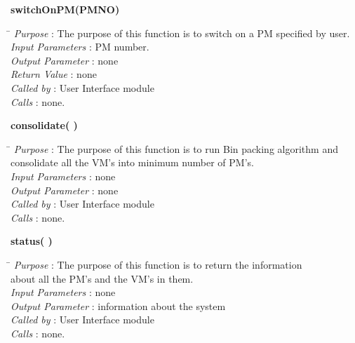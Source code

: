 \documentclass[a4paper,11pt]{article}
\begin{document}
\begin{itemize}
\textbf{switchOnPM(PM\textunderscore NO)}
  
\begin{tabbing}
\hspace*{4cm}\=  \kill
 \textit{Purpose} \> : The purpose of this function is to switch on a PM specified by user.\\
  \textit{Input Parameters} \> : PM number. \\
  \textit{Output Parameter} \> : none \\
  \textit{Return Value} \> : none \\
  \textit{Called by} \> : User Interface module \\
  \textit{Calls} \> : none.
\end{tabbing}

\textbf{consolidate( )}
  
\begin{tabbing}
\hspace*{4cm}\=  \kill
 \textit{Purpose} \> : The purpose of this function is to run Bin packing algorithm and \\ \> consolidate all the VM's into minimum number of PM's.\\
  \textit{Input Parameters} \> : none \\
  \textit{Output Parameter} \> : none \\
    \textit{Called by} \> : User Interface module \\
  \textit{Calls} \> : none.
\end{tabbing}
\pagebreak
\textbf{status( )}
  
\begin{tabbing}
\hspace*{4cm}\=  \kill
 \textit{Purpose} \> : The purpose of this function is to return the information \\ \>about all the PM's and the VM's in them.\\
  \textit{Input Parameters} \> : none \\
  \textit{Output Parameter} \> : information about the system \\
    \textit{Called by} \> : User Interface module \\
  \textit{Calls} \> : none.
\end{tabbing}
\end{itemize}
\end{document}
